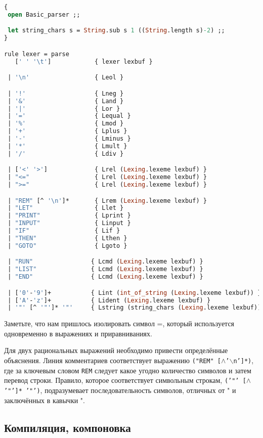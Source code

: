 \begin{lstlisting}[language=Caml]
{
 open Basic_parser ;;

 let string_chars s = String.sub s 1 ((String.length s)-2) ;;
}

rule lexer = parse
   [' ' '\t']            { lexer lexbuf }

 | '\n'                  { Leol }

 | '!'                   { Lneg }
 | '&'                   { Land }
 | '|'                   { Lor }
 | '='                   { Lequal }
 | '%'                   { Lmod }
 | '+'                   { Lplus }
 | '-'                   { Lminus }
 | '*'                   { Lmult }
 | '/'                   { Ldiv }

 | ['<' '>']             { Lrel (Lexing.lexeme lexbuf) }
 | "<="                  { Lrel (Lexing.lexeme lexbuf) }
 | ">="                  { Lrel (Lexing.lexeme lexbuf) }

 | "REM" [^ '\n']*       { Lrem (Lexing.lexeme lexbuf) }
 | "LET"                 { Llet }
 | "PRINT"               { Lprint }
 | "INPUT"               { Linput }
 | "IF"                  { Lif }
 | "THEN"                { Lthen }
 | "GOTO"                { Lgoto }

 | "RUN"                { Lcmd (Lexing.lexeme lexbuf) }
 | "LIST"               { Lcmd (Lexing.lexeme lexbuf) }
 | "END"                { Lcmd (Lexing.lexeme lexbuf) }

 | ['0'-'9']+           { Lint (int_of_string (Lexing.lexeme lexbuf)) }
 | ['A'-'z']+           { Lident (Lexing.lexeme lexbuf) }
 | '"' [^ '"']* '"'     { Lstring (string_chars (Lexing.lexeme lexbuf)) }
\end{lstlisting}

Заметьте, что нам пришлось изолировать символ =, который используется
одновременно в выражениях и приравниваниях.

Для двух рациональных выражений необходимо привести определённые объяснения.
Линия комментариев соответствует выражению \texttt{("REM"
[$\wedge$'$\backslash$n']*)}, где за ключевым словом \texttt{REM} следует какое
угодно количество символов и затем перевод строки. Правило, которое
соответствует символьным строкам, \texttt{('"' [$\wedge$ '"']* '"')},
подразумевает последовательность символов, отличных от " и заключённых в
кавычки ".

\subsection{Компиляция, компоновка}

